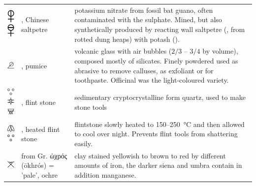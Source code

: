\documentclass[british,final,landscape]{scrartcl}
\begin{document}
\begin{refsection}
\begin{supertabular}{p{0.3\textwidth}p{0.34\textwidth}p{0.34\textwidth}}
   \includegraphics[width=5mm]{Mineral/LapisPrunellae} \includegraphics[width=5mm]{Mineral/LapisPrunellae2} & , Chinese saltpetre & potassium nitrate  from fossil bat guano, often contaminated with the sulphate. Mined, but also synthetically produced by reacting wall saltpetre (, from rotted dung heaps) with potash (). \\
   \includegraphics[width=5mm]{Mineral/LapisPumex} & , pumice & volcanic glass with air bubbles (\(2/3\) -- \(3/4\) by volume), composed mostly of silicates. Finely powdered used as abrasive to remove calluses, as exfoliant or for toothpaste. Officinal was the light-coloured variety. \\
   \includegraphics[width=5mm]{Mineral/LapisSilex} \includegraphics[width=5mm]{Mineral/LapisSilex2} \includegraphics[width=5mm]{Mineral/LapisSilex3} & , flint stone & sedimentary cryptocrystalline form quartz, used to make stone tools \\
   \includegraphics[width=5mm]{Mineral/LapisSilexUstus} \includegraphics[width=5mm]{Mineral/LapisSilexUstus2} & , heated flint stone & flintstone slowly heated to \num{150}--\SI{250}{\celsius} and then allowed to cool over night. Prevents flint tools from shattering easily. \\
   \includegraphics[width=5mm]{Mineral/Ochre} & from Gr. \foreignlanguage{greek}{ ὠχρός} (ōkhrós) = 'pale', ochre & clay stained yellowish to brown to red by different amounts of iron, the darker siena and umbra contain in addition manganese.  \\

\end{supertabular}
\end{refsection}
\end{document}
